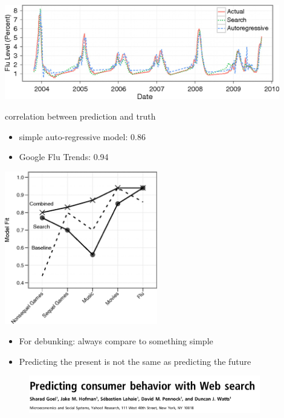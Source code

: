 \documentclass[aspectratio=169]{beamer}
\begin{document}
\begin{frame}

\begin{center}
  \includegraphics[width = 0.9\textwidth]{figures/goel_predicting_2010_fig4}
\end{center}

correlation between prediction and truth
\begin{itemize}
\item simple auto-regressive model: 0.86
\item Google Flu Trends: 0.94
\end{itemize}

\end{frame}
\begin{frame}

\begin{center}
  \includegraphics[width = 0.5\textwidth]{figures/goel_predicting_2010_fig5}
\end{center}

\end{frame}
\begin{frame}

\begin{itemize}
\item For debunking: always compare to something simple
\pause 
\item Predicting the present is not the same as predicting the future
\end{itemize}

\end{frame}
\begin{frame}

\begin{figure}
  \includegraphics[width = 0.9\textwidth]{figures/goel_predicting_2010_title}
\end{figure}

\end{frame}

\frame{\titlepage}
\end{document}
